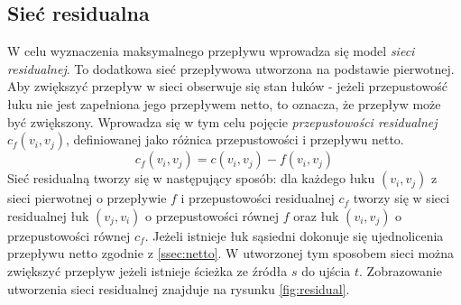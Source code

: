 \subsection{Sieć residualna}\label{ssec:siecResidualna}
W celu wyznaczenia maksymalnego przepływu wprowadza się model \textit{sieci residualnej}. To dodatkowa sieć przepływowa utworzona na podstawie pierwotnej. Aby zwiększyć przepływ w sieci obserwuje się stan łuków - jeżeli przepustowość łuku nie jest zapełniona jego przepływem netto, to oznacza, że przepływ może być zwiększony. Wprowadza się w tym celu pojęcie \textit{przepustowości residualnej} $ c_f(v_i,v_j) $, definiowanej jako różnica przepustowości i przepływu netto.
$$ c_f(v_i,v_j)=c(v_i,v_j)-f(v_i,v_j) $$
Sieć residualną tworzy się w następujący sposób: dla każdego łuku $ (v_i,v_j) $ z sieci pierwotnej o przepływie $ f $ i przepustowości residualnej $ c_f $ tworzy się w sieci residualnej łuk $ (v_j,v_i) $ o przepustowości równej $ f $ oraz łuk $ (v_i,v_j) $ o przepustowości równej $ c_f $. Jeżeli istnieje łuk sąsiedni dokonuje się ujednolicenia przepływu netto zgodnie z \ref{ssec:netto}. W utworzonej tym sposobem sieci można zwiększyć przepływ jeżeli istnieje ścieżka ze źródła $ s $ do ujścia $ t $. Zobrazowanie utworzenia sieci residualnej znajduje na rysunku \ref{fig:residual}.
